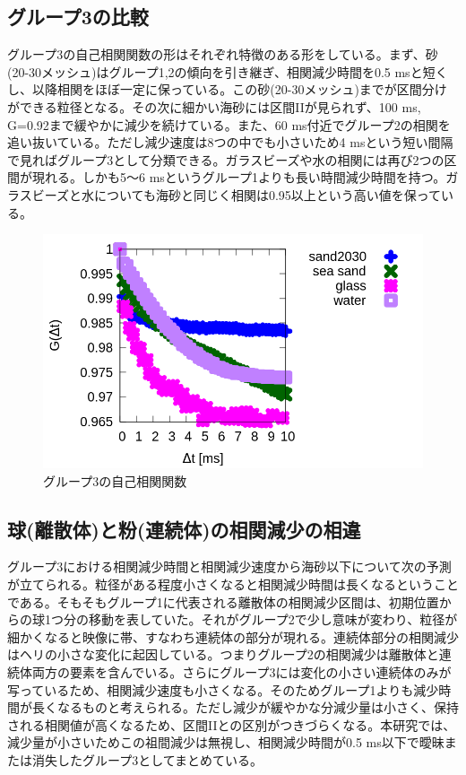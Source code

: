 \documentclass[a4paper,12pt,dvipdfmx]{jsarticle}
\newcommand{\II}{I\hspace{-.1em}I}
\begin{document}
\subsection{グループ3の比較}
グループ3の自己相関関数の形はそれぞれ特徴のある形をしている。まず、砂(20-30メッシュ)はグループ1,2の傾向を引き継ぎ、相関減少時間を0.5 msと短くし、以降相関をほぼ一定に保っている。この砂(20-30メッシュ)までが区間分けができる粒径となる。その次に細かい海砂には区間\II が見られず、100 ms, G=0.92まで緩やかに減少を続けている。また、60 ms付近でグループ2の相関を追い抜いている。ただし減少速度は8つの中でも小さいため4 msという短い間隔で見ればグループ3として分類できる。ガラスビーズや水の相関には再び2つの区間が現れる。しかも5～6 msというグループ1よりも長い時間減少時間を持つ。ガラスビーズと水についても海砂と同じく相関は0.95以上という高い値を保っている。
\begin{figure}[H]
	\includegraphics[scale=0.4]{three_up.png}
	\caption{グループ3の自己相関関数}
	\label{fig:three}
\end{figure}
\subsection{球(離散体)と粉(連続体)の相関減少の相違}
グループ3における相関減少時間と相関減少速度から海砂以下について次の予測が立てられる。粒径がある程度小さくなると相関減少時間は長くなるということである。そもそもグループ1に代表される離散体の相関減少区間は、初期位置からの球1つ分の移動を表していた。それがグループ2で少し意味が変わり、粒径が細かくなると映像に帯、すなわち連続体の部分が現れる。連続体部分の相関減少はヘリの小さな変化に起因している。つまりグループ2の相関減少は離散体と連続体両方の要素を含んでいる。さらにグループ3には変化の小さい連続体のみが写っているため、相関減少速度も小さくなる。そのためグループ1よりも減少時間が長くなるものと考えられる。ただし減少が緩やかな分減少量は小さく、保持される相関値が高くなるため、区間\II との区別がつきづらくなる。本研究では、減少量が小さいためこの祖間減少は無視し、相関減少時間が0.5 ms以下で曖昧または消失したグループ3としてまとめている。
\end{document}
